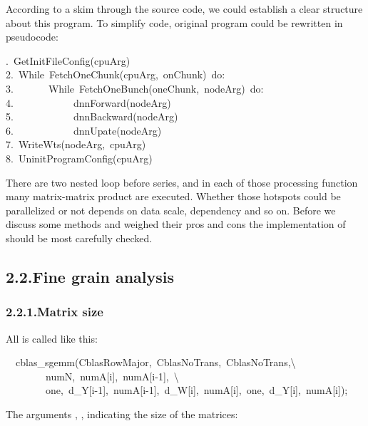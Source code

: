 \documentclass{article}
\begin{document}
According to a skim through the source code, we could establish a clear structure about this program. To simplify code, original program could be rewritten in pseudocode:%
\begin{mdpre}%
.~{GetInitFileConfig}(cpuArg)\\
{2}.~{While}~{FetchOneChunk}(cpuArg,~onChunk)~{do}:\\
{3}.~~~~~~~{While}~{FetchOneBunch}(oneChunk,~nodeArg)~{do}:\\
{4}.~~~~~~~~~~~~dnnForward(nodeArg)\\
{5}.~~~~~~~~~~~~dnnBackward(nodeArg)\\
{6}.~~~~~~~~~~~~dnnUpate(nodeArg)\\
{7}.~{WriteWts}(nodeArg,~cpuArg)\\
{8}.~{UninitProgramConfig}(cpuArg)\\
\end{mdpre}\noindent{}There are two nested loop before  series, and 
in each of those processing function many matrix-matrix product are
executed. Whether those hotspots could be parallelized or not depends
on data scale, dependency and so on. Before we discuss some methods and weighed their pros and cons the implementation of  should be most carefully checked.

\subsection{2.2.\hspace*{0.5em}Fine grain analysis}\label{sec-fine-grain-analysis}%

\subsubsection{2.2.1.\hspace*{0.5em}Matrix size}\label{sec-matrix-size}%

\noindent{}All  is called like this:%
\begin{mdpre}%
\noindent~~cblas\_sgemm({CblasRowMajor},~{CblasNoTrans},~{CblasNoTrans},\textbackslash{}\\
~~~~~~~~numN,~numA[i],~numA[i-{1}],~\textbackslash{}\\
~~~~~~~~one,~d\_Y[i-{1}],~numA[i-{1}],~d\_W[i],~numA[i],~one,~d\_Y[i],~numA[i]);%
\end{mdpre}\noindent{}The arguments , ,  indicating the size of the matrices:
\end{document}
